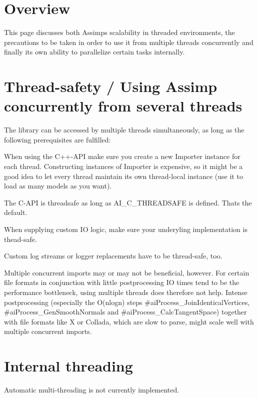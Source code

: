 \hypertarget{importer_notes_overview}{}\section{Overview}\label{importer_notes_overview}
This page discusses both Assimps scalability in threaded environments, the precautions to be taken in order to use it from multiple threads concurrently and finally its own ability to parallelize certain tasks internally.\hypertarget{threading_threadsafety}{}\section{Thread-\/safety / Using Assimp concurrently from several threads}\label{threading_threadsafety}
The library can be accessed by multiple threads simultaneously, as long as the following prerequisites are fulfilled\+: 
\begin{DoxyItemize}
\item When using the C++-\/\+A\+P\+I make sure you create a new Importer instance for each thread. Constructing instances of Importer is expensive, so it might be a good idea to let every thread maintain its own thread-\/local instance (use it to load as many models as you want). 
\item The C-\/\+A\+P\+I is threadsafe as long as A\+I\+\_\+\+C\+\_\+\+T\+H\+R\+E\+A\+D\+S\+A\+F\+E is defined. That\textquotesingle{}s the default.  
\item When supplying custom I\+O logic, make sure your underyling implementation is thead-\/safe. 
\item Custom log streams or logger replacements have to be thread-\/safe, too. 
\end{DoxyItemize}

Multiple concurrent imports may or may not be beneficial, however. For certain file formats in conjunction with little postprocessing I\+O times tend to be the performance bottleneck, using multiple threads does therefore not help. Intense postprocessing (especially the O(nlogn) steps \#ai\+Process\+\_\+\+Join\+Identical\+Vertices, \#ai\+Process\+\_\+\+Gen\+Smooth\+Normals and \#ai\+Process\+\_\+\+Calc\+Tangent\+Space) together with file formats like X or Collada, which are slow to parse, might scale well with multiple concurrent imports.\hypertarget{threading_automt}{}\section{Internal threading}\label{threading_automt}
Automatic multi-\/threading is not currently implemented. 